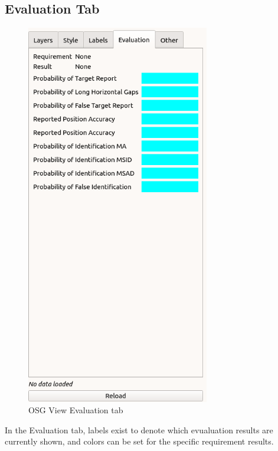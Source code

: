 \subsection{Evaluation Tab}
\label{sec:osgview_eval_tab} 

\begin{figure}[H]
   \center
    \includegraphics[width=8cm,frame]{figures/osgview_eval_tab.png}
  \caption{OSG View Evaluation tab}
\end{figure}

In the Evaluation tab, labels exist to denote which evualuation results are currently shown, and colors can be set for the specific requirement results.
